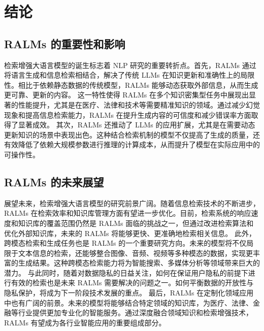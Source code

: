 
\chapter{结论}

\section{RALMs 的重要性和影响}
检索增强大语言模型的诞生标志着 NLP 研究的重要转折点。首先，RALMs 通过将语言生成和信息检索相结合，解决了传统 LLMs 在知识更新和准确性上的局限性。相比于依赖静态数据的传统模型，RALMs 能够动态获取外部信息，从而生成更可靠、更新的内容\cite{lewis2021retrievalaugmentedgenerationknowledgeintensivenlp}。
这一特性使得 RALMs 在多个知识密集型任务中展现出显著的性能提升，尤其是在医疗、法律和技术等需要精准知识的领域。通过减少幻觉现象和提高信息检索能力，RALMs 在提升生成内容的可信度和减少错误率方面取得了显著成效\cite{guu2020realmretrievalaugmentedlanguagemodel}。
其次，RALMs 还推动了 LLMs 的应用扩展，尤其是在需要动态更新知识的场景中表现出色。这种结合检索机制的模型不仅提高了生成的质量，还有效降低了依赖大规模参数进行推理的计算成本，从而提升了模型在实际应用中的可操作性。
\section{RALMs 的未来展望}
展望未来，检索增强大语言模型的研究前景广阔。随着信息检索技术的不断进步，RALMs 在检索效率和知识库管理方面有望进一步优化。目前，检索系统的响应速度和知识库的覆盖范围仍然是 RALMs 面临的挑战之一，但通过改进检索算法和优化外部知识库，未来的 RALMs 将能够更快、更准确地检索相关信息。
此外，跨模态检索和生成任务也是 RALMs 的一个重要研究方向。未来的模型将不仅局限于文本信息的检索，还能够整合图像、音频、视频等多种模态的数据，实现更丰富的生成结果。这种跨模态检索能力将为智能搜索、多媒体分析等领域带来巨大的潜力。
与此同时，随着对数据隐私的日益关注，如何在保证用户隐私的前提下进行有效的检索也是未来 RALMs 需要解决的问题之一。如何平衡数据的开放性与隐私保护，将成为下一阶段技术发展的重点\cite{7958568}。
最后，RALMs 在定制化领域应用中也有广阔的前景。未来的模型将能够结合特定领域的知识库，为医疗、法律、金融等行业提供更加专业化的智能服务。通过深度融合领域知识和检索增强技术，RALMs 有望成为各行业智能应用的重要组成部分。